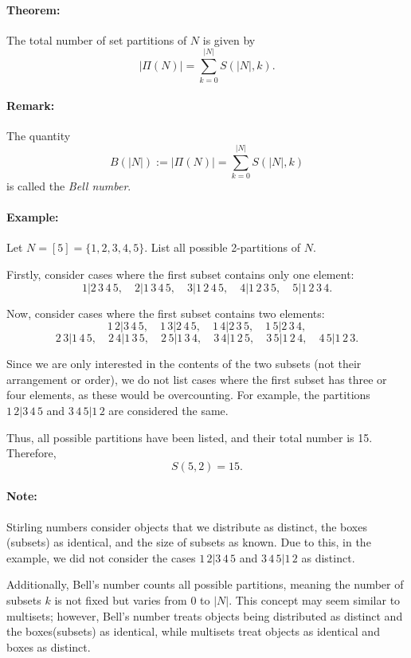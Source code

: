 \documentclass{article}
\begin{document}
\paragraph{Theorem:}  
The total number of set partitions of \( N \) is given by  
\[
|\Pi(N)| = \sum_{k=0}^{|N|} S(|N|, k).
\]  
\paragraph{Remark:}  
The quantity  
\[
B(|N|) := |\Pi(N)| = \sum_{k=0}^{|N|} S(|N|, k)
\]  
is called the \emph{Bell number}.
\paragraph{Example:}  
Let \( N = [5] = \{1,2,3,4,5\} \). List all possible 2-partitions of \( N \).  

Firstly, consider cases where the first subset contains only one element:  
\[
1 | 2\,3\,4\,5, \quad 2 | 1\,3\,4\,5, \quad 3 | 1\,2\,4\,5, \quad 4 | 1\,2\,3\,5, \quad 5 | 1\,2\,3\,4.
\]  

Now, consider cases where the first subset contains two elements:  
\[
1\,2 | 3\,4\,5, \quad 1\,3 | 2\,4\,5, \quad 1\,4 | 2\,3\,5, \quad 1\,5 | 2\,3\,4,
\]
\[
2\,3 | 1\,4\,5, \quad 2\,4 | 1\,3\,5, \quad 2\,5 | 1\,3\,4, \quad 3\,4 | 1\,2\,5, \quad 3\,5 | 1\,2\,4, \quad 4\,5 | 1\,2\,3.
\]  

Since we are only interested in the contents of the two subsets (not their arrangement or order), we do not list cases where the first subset has three or four elements, as these would be overcounting.  
For example, the partitions \( 1\,2 | 3\,4\,5 \) and \( 3\,4\,5 | 1\,2 \) are considered the same.  

Thus, all possible partitions have been listed, and their total number is 15. Therefore,  
\[
S(5,2) = 15.
\]

\paragraph{Note:}  
Stirling numbers consider objects that we distribute as distinct, the boxes (subsets) as identical, and the size of subsets as known. Due to this, in the example, we did not consider the cases \( 1\,2 | 3\,4\,5 \) and \( 3\,4\,5 | 1\,2 \) as distinct.  

Additionally, Bell's number counts all possible partitions, meaning the number of subsets \( k \) is not fixed but varies from \( 0 \) to \( |N| \). This concept may seem similar to multisets; however, Bell's number treats objects being distributed as distinct and the boxes(subsets) as identical, while multisets treat objects as identical and boxes as distinct.
\end{document}
